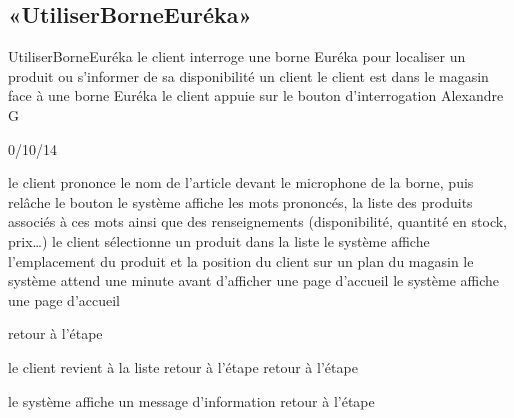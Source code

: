 \subsection{«UtiliserBorneEuréka»}

\startCU
\nom UtiliserBorneEuréka
\but le client interroge une borne Euréka pour localiser un produit ou s’informer de sa disponibilité
\acteur un client
\precondition le client est dans le magasin face à une borne Euréka
\declenchement le client appuie sur le bouton d'interrogation
\auteur Alexandre G
\date 30/10/14

\nominal %
\startnominal
{} le client prononce le nom de l'article devant le microphone de la borne, puis relâche le bouton
 le système affiche les mots prononcés, la liste des produits associés à ces mots ainsi que des renseignements (disponibilité, quantité en stock, prix\dots) 
 le client sélectionne un produit dans la liste
\etape le système affiche l'emplacement du produit et la position du client sur un plan du magasin
 le système attend une minute avant d'afficher une page d'accueil
\stopnominal
\postcondition le système affiche une page d'accueil

\alternatifs 

\etape retour à l'étape 
\stopcondition
\stopalternatif

  \etape le client revient à la liste 
  \etape retour à l'étape 
\stopcondition
{}
  \etape retour à l'étape 
\stopcondition
\stopalternatif

\exception
{}
  \etape le système affiche un message d'information
  \etape retour à l'étape 
\stopcondition
\stopalternatif

\stopCU
